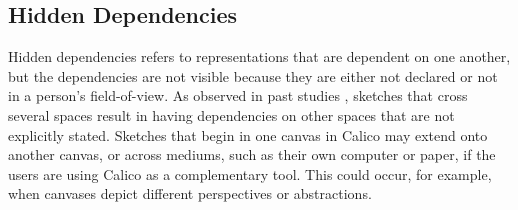 \documentclass[12pt,fleqn]{ucithesis}
\begin{document}


%

\subsection{Hidden Dependencies}


Hidden dependencies refers to representations that are dependent on one another, but the dependencies are not visible because they are either not declared or not in a person's field-of-view. As observed in past studies \cite{dekel2007notation}, sketches that cross several spaces result in having dependencies on other spaces that are not explicitly stated. Sketches that begin in one canvas in Calico may extend onto another canvas, or across mediums, such as their own computer or paper, if the users are using Calico as a complementary tool. This could occur, for example, when canvases depict different perspectives or abstractions. 
\end{document}
